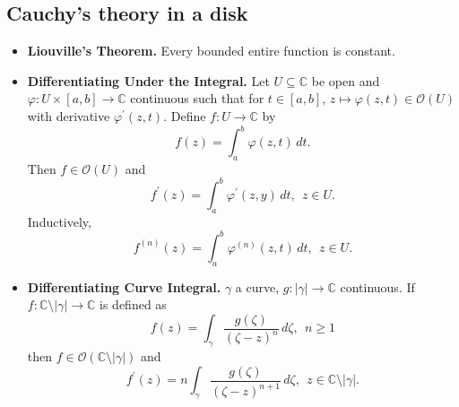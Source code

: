 \documentclass{article}
\newenvironment{topic}[1]{%
{\subsection{#1}}%
\begin{itemize}%
}{%
\end{itemize}%
}
\newcommand{\theorem}[1]{\item {\bf #1.}}
\newcommand{\corollary}[1]{\item {\bf #1.}}
\newcommand{\holo}[1]{\mathcal{O}(#1)}
\begin{document}
\begin{topic}{Cauchy's theory in a disk}
\theorem{Liouville's Theorem} Every bounded entire function is constant.

\theorem{Differentiating Under the Integral} Let $U \subseteq \mathbb{C}$ be open and $\varphi : U \times [a, b] \to \mathbb{C}$ continuous such that for $t \in [a, b]$, $z \mapsto \varphi(z, t) \in \holo{U}$ with derivative $\varphi^\prime(z, t)$. Define $f : U \to \mathbb{C}$  by $$f(z) = \int_a^b \varphi(z, t)\,dt.$$ Then $f \in \holo{U}$ and $$f^\prime(z) = \int_a^b \varphi^\prime(z, y)\,dt,~~z \in U.$$ Inductively, $$f^{(n)}(z) = \int_a^b \varphi^{(n)}(z, t)\,dt,~~z \in U.$$

\corollary{Differentiating Curve Integral} $\gamma$ a curve, $g : |\gamma| \to \mathbb{C}$ continuous. If $f : \mathbb{C} \setminus |\gamma| \to \mathbb{C}$ is defined as $$f(z) = \int_\gamma \dfrac{g(\zeta)}{(\zeta - z)^n}\,d\zeta,~~n \geq 1$$ then $f \in \holo{\mathbb{C} \setminus |\gamma|}$ and $$f^\prime(z) = n \int_\gamma \dfrac{g(\zeta)}{(\zeta - z)^{n+1}}\,d\zeta,~~z \in \mathbb{C} \setminus |\gamma|.$$

\end{topic}
\end{document}
